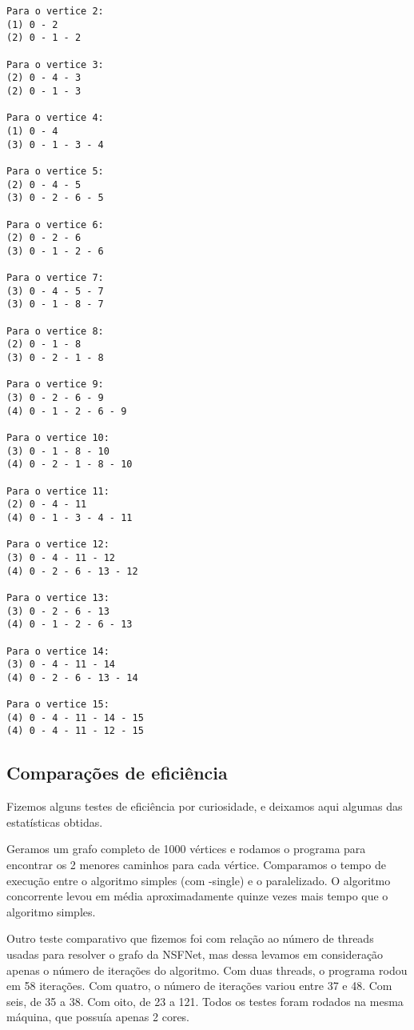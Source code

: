 \documentclass[a4paper,11pt]{article}
\begin{document}
\begin{verbatim}
Para o vertice 2:
(1) 0 - 2
(2) 0 - 1 - 2

Para o vertice 3:
(2) 0 - 4 - 3
(2) 0 - 1 - 3

Para o vertice 4:
(1) 0 - 4
(3) 0 - 1 - 3 - 4

Para o vertice 5:
(2) 0 - 4 - 5
(3) 0 - 2 - 6 - 5

Para o vertice 6:
(2) 0 - 2 - 6
(3) 0 - 1 - 2 - 6

Para o vertice 7:
(3) 0 - 4 - 5 - 7
(3) 0 - 1 - 8 - 7

Para o vertice 8:
(2) 0 - 1 - 8
(3) 0 - 2 - 1 - 8

Para o vertice 9:
(3) 0 - 2 - 6 - 9
(4) 0 - 1 - 2 - 6 - 9

Para o vertice 10:
(3) 0 - 1 - 8 - 10
(4) 0 - 2 - 1 - 8 - 10

Para o vertice 11:
(2) 0 - 4 - 11
(4) 0 - 1 - 3 - 4 - 11

Para o vertice 12:
(3) 0 - 4 - 11 - 12
(4) 0 - 2 - 6 - 13 - 12

Para o vertice 13:
(3) 0 - 2 - 6 - 13
(4) 0 - 1 - 2 - 6 - 13

Para o vertice 14:
(3) 0 - 4 - 11 - 14
(4) 0 - 2 - 6 - 13 - 14

Para o vertice 15:
(4) 0 - 4 - 11 - 14 - 15
(4) 0 - 4 - 11 - 12 - 15

\end{verbatim}

  \subsection{Comparações de eficiência}
    Fizemos alguns testes de eficiência por curiosidade, e deixamos aqui
    algumas das estatísticas obtidas.

    Geramos um grafo completo de 1000 vértices e rodamos o programa para
    encontrar os 2 menores caminhos para cada vértice. Comparamos o tempo de
    execução entre o algoritmo simples (com -single) e o paralelizado. O
    algoritmo concorrente levou em média aproximadamente quinze vezes mais tempo
    que o algoritmo simples.

    Outro teste comparativo que fizemos foi com relação ao número de threads
    usadas para resolver o grafo da NSFNet, mas dessa levamos em consideração
    apenas o número de iterações do algoritmo. Com duas threads, o programa
    rodou em 58 iterações. Com quatro, o número de iterações variou entre 37 e
    48. Com seis, de 35 a 38. Com oito, de 23 a 121. Todos os testes foram
    rodados na mesma máquina, que possuía apenas 2 cores.
\end{document}
